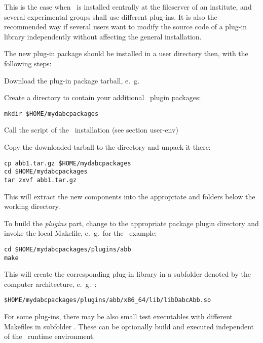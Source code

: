 This is the case when \dabc\ is installed centrally at the fileserver
of an institute, and several experimental groups shall use different plug-ins.
It is also the recommended way if several users 
want to modify the source code of a plug-in library independently without 
affecting the general installation.


The new plug-in package should be installed in a user directory
then, with the following steps:

\bnum
\item Download the plug-in package tarball, e.~g.\ 

\item Create a directory to contain your additional \dabc\ plugin packages:
\begin{verbatim}
mkdir $HOME/mydabcpackages
\end{verbatim} 

\item Call the  script of the \dabc\ installation (see section user-env)

\item Copy the downloaded tarball to the  directory and unpack it there:
\begin{verbatim}
cp abb1.tar.gz $HOME/mydabcpackages
cd $HOME/mydabcpackages
tar zxvf abb1.tar.gz
\end{verbatim} 
This will extract the new components into the appropriate  and
 folders below the working directory. 

\item To build the {\em plugins} part, change to the appropriate package plugin
directory and invoke the local Makefile, e.~g.\ for the \ABB\ example:

\begin{verbatim}
cd $HOME/mydabcpackages/plugins/abb
make
\end{verbatim} 
This will create the corresponding plug-in library in a subfolder denoted by the
computer architecture, e.~g.~:
\begin{verbatim}
$HOME/mydabcpackages/plugins/abb/x86_64/lib/libDabcAbb.so
\end{verbatim} 


\item For some plug-ins, there may be also small test executables with different Makefiles in subfolder . These can be optionally build and executed independent of the
\dabc\ runtime environment.

